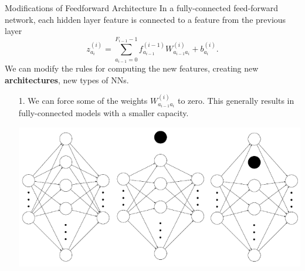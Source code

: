 \documentclass[12pt,t]{beamer}
\begin{document}
\begin{frame}{Modifications of Feedforward Architecture}
In a fully-connected feed-forward network, each hidden layer feature is connected to a feature from the previous layer
$$ z_{a_i}^{(i)} = \sum_{a_{i-1}=0}^{F_{i-1}-1} f^{(i-1)}_{a_{i-1}} W_{a_{i-1} a_i}^{(i)} + b_{a_i}^{(i)}. $$
We can modify the rules for computing the new features, creating new {\bf architectures}, new types of NNs.

\begin{itemize}
\item[1.] We can force some of the weights  $W^{(i)}_{a_{i-1}a_i}$ to zero.  This generally results in fully-connected models with a smaller capacity.
\centerline{
\includegraphics[height=0.2\textheight]{./images/dropout.png}
} 
\end{itemize}
\end{frame}
\end{document}
